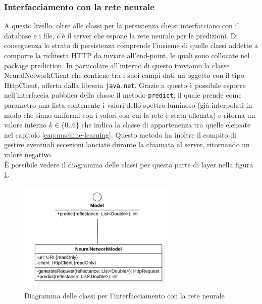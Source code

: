 \subsubsection{Interfacciamento con la rete neurale}
A questo livello, oltre alle classi per la persistenza che si interfacciano con il database e i file, c'è il server che espone la rete neurale per le predizioni. Di conseguenza lo strato di persistenza comprende l'insieme di quelle classi addette a comporre la richiesta HTTP da inviare all'end-point, le quali sono collocate nel package prediction. In particolare all'interno di questo troviamo la classe NeuralNetworkClient che contiene tra i suoi campi dati un oggetto con il tipo HttpClient, offerta dalla libreria \verb|java.net|. Grazie a questo è possibile esporre nell'interfaccia pubblica della classe il metodo \verb|predict|, il quale prende come parametro una lista contenente i valori dello spettro luminoso (già interpolati in modo che siano uniformi con i valori con cui la rete è stata allenata) e ritorna un valore interno $k \in \{0 .. 6 \}$ che indica la classe di appartenenza tra quelle elencate nel capitolo \ref{cap:machine-learning}. Questo metodo ha inoltre il compito di gestire eventuali eccezioni lanciate durante la chiamata al server, ritornando un valore negativo.\\
È possibile vedere il diagramma delle classi per questa parte di layer nella figura \ref{fig:class_diagram_neural_network}.

\begin{figure}
    \centering
    \includegraphics[width=0.7\textwidth]{immagini/model_classes.png}
    \caption{Diagramma delle classi per l'interfacciamento con la rete neurale}
    \label{fig:class_diagram_neural_network}
\end{figure}


